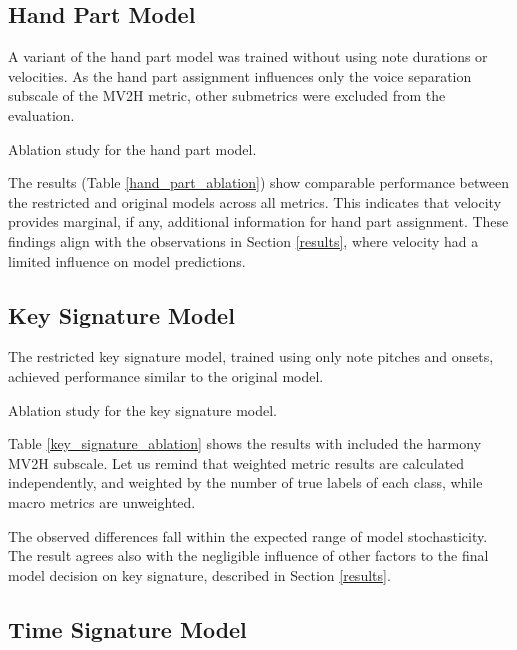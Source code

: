 \subsection{Hand Part Model}

A variant of the hand part model was trained without using note durations or velocities. As the hand part assignment influences only the voice separation subscale of the MV2H metric, other submetrics were excluded from the evaluation.

\begin{table}[ht!]
\centering

\caption[Ablation study for the hand part model.]{Ablation study for the hand part model.}
\label{hand_part_ablation}
\end{table}

The results (Table \ref{hand_part_ablation}) show comparable performance between the restricted and original models across all metrics. This indicates that velocity provides marginal, if any, additional information for hand part assignment. These findings align with the observations in Section \ref{results}, where velocity had a limited influence on model predictions.

\subsection{Key Signature Model}

The restricted key signature model, trained using only note pitches and onsets, achieved performance similar to the original model.

\begin{table}[ht!]
\centering

\caption[Ablation study for the key signature model.]{Ablation study for the key signature model.}
\label{key_signature_ablation}
\end{table}

Table \ref{key_signature_ablation} shows the results with included the harmony MV2H subscale. Let us remind that weighted metric results are calculated independently, and weighted by the number of true labels of each class, while macro metrics are unweighted.

The observed differences fall within the expected range of model stochasticity. The result agrees also with the negligible influence of other factors to the final model decision on key signature, described in Section \ref{results}.

\subsection{Time Signature Model}

